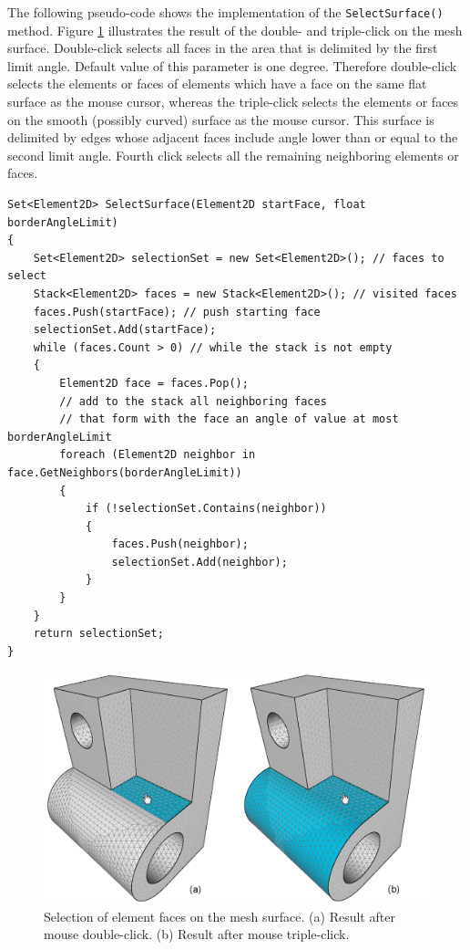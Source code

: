 The following pseudo-code shows the implementation of the \texttt{SelectSurface()} method. Figure \ref{fig:element-face-selection} illustrates the result of the double- and triple-click on the mesh surface. Double-click selects all faces in the area that is delimited by the first limit angle. Default value of this parameter is one degree. Therefore double-click selects the elements or faces of elements which have a face on the same flat surface as the mouse cursor, whereas the triple-click selects the elements or faces on the smooth (possibly curved) surface as the mouse cursor. This surface is delimited by edges whose adjacent faces include angle lower than or equal to the second limit angle. Fourth click selects all the remaining neighboring elements or faces.

\begin{lstlisting}
Set<Element2D> SelectSurface(Element2D startFace, float borderAngleLimit)
{
	Set<Element2D> selectionSet = new Set<Element2D>(); // faces to select
	Stack<Element2D> faces = new Stack<Element2D>(); // visited faces
	faces.Push(startFace); // push starting face
	selectionSet.Add(startFace);
	while (faces.Count > 0) // while the stack is not empty
	{
		Element2D face = faces.Pop();
		// add to the stack all neighboring faces
		// that form with the face an angle of value at most borderAngleLimit
		foreach (Element2D neighbor in face.GetNeighbors(borderAngleLimit))
		{
			if (!selectionSet.Contains(neighbor))
			{
				faces.Push(neighbor);
				selectionSet.Add(neighbor);
			}
		}
	}
	return selectionSet;
}
\end{lstlisting}

\begin{figure}[H]
\centering
\includegraphics[width=\textwidth]{figures/appendix-mesh-visualization/figure7}
\decoRule
\caption[Selection of element faces]{Selection of element faces on the mesh surface. (a) Result after mouse double-click. (b) Result after mouse triple-click.}
\label{fig:element-face-selection}
\end{figure}


